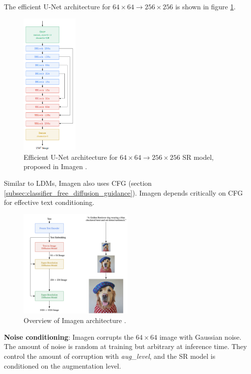 The efficient U-Net architecture for $64\times 64 \rightarrow 256\times 256$ is shown in figure \ref{fig:imagen_efficient_unet}.

\begin{figure}
    \centering
    \includegraphics[width=0.25\textwidth]{images/imagen/efficient_unet.png}
    \caption{Efficient U-Net architecture for $64\times 64 \rightarrow 256\times 256$ SR model, proposed in Imagen \cite{imagen}.}
    \label{fig:imagen_efficient_unet}
\end{figure}

Similar to LDMs, Imagen also uses CFG \cite{classifier_free_guidance} (section \ref{subsec:classifier_free_diffusion_guidance}). Imagen depends critically on CFG for effective text conditioning.

\begin{figure}
    \centering
    \includegraphics[width=0.5\textwidth]{images/imagen/architecture.png}
    \caption{Overview of Imagen architecture \cite{imagen}.}
    \label{fig:imagen_architecture}
\end{figure}

\textbf{Noise conditioning}: Imagen corrupts the $64\times 64$ image with Gaussian noise. The amount of noise is random at training but arbitrary at inference time. They control the amount of corruption with \textit{aug\_level}, and the SR model is conditioned on the augmentation level.

